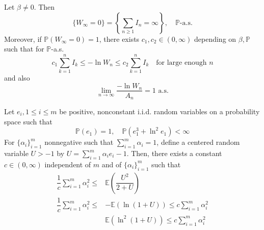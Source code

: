 \begin{theorem}
    Let $\beta \neq 0$. Then
    \[
    \{W_{\infty} = 0\} = \left\{\sum\limits_{n\geq 1}I_n = \infty\right\},\quad\mathbb{P}\text{-a.s.}
    \]
    Moreover, if $\mathbb{P}(W_{\infty} = 0)= 1$, there exists $c_1,c_2 \in (0,\infty)$ depending on $\beta,\mathbb{P}$ such that for $\mathbb{P}$-a.s.
    \[
    c_1 \sum\limits_{k=1}^n I_k \leq -\ln W_n \leq c_2\sum\limits_{k=1}^n I_k\quad\text{for large enough }n
    \]
    and also
    \[
    \lim_{n\to\infty}\dfrac{-\ln W_n}{A_n} = 1\text{ a.s.}
    \]
\end{theorem}
\begin{lemma}
    Let $e_i, 1\leq i \leq m$ be positive, nonconstant i.i.d. random variables on a probability space such that
    \[
\mathbb{P}(e_1) = 1,\quad \mathbb{P}(e_1^3 + \ln^2 e_1) < \infty
    \]
    For $\{\alpha_i\}_{i=1}^m$ nonnegative such that $\sum\limits_{i=1}^m \alpha_i = 1$, define a centered random variable $U > -1$ by $U = \sum\limits_{i=1}^m \alpha_i e_i - 1$. Then, there exists a constant $c\in (0,\infty)$ independent of $m$ and of $\{\alpha_i\}_{i=1}^m$ such that
    \[
    \begin{aligned}
        \dfrac{1}{c}\sum\limits_{i=1}^m \alpha_i^2 \leq &\mathbb{E}\left(\dfrac{U^2}{2+U}\right) \\
        \dfrac{1}{c}\sum\limits_{i=1}^m \alpha_i^2 \leq &-\mathbb{E}\left(\ln(1+U)\right) \leq c\sum\limits_{i=1}^m \alpha_i^2
        \\ 
        &\mathbb{E}\left(\ln^2(1+U)\right) \leq c\sum\limits_{i=1}^m \alpha_i^2
    \end{aligned}
    \]
\end{lemma}
